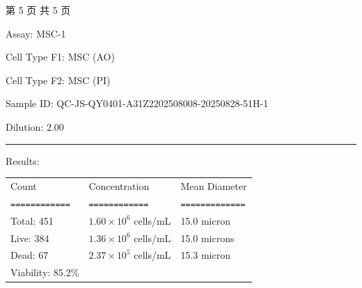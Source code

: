 \documentclass[UTF8,10pt,a4paper,fontset=fandol]{ctexart}
\newcommand{\fieldvalue}[1]{#1}
\begin{document}
\begin{center}
第 5 页 共 5 页
\end{center}

\newpage

\noindent Assay: %
\fieldvalue{MSC-1}

\medskip
\noindent Cell Type F1: %
\fieldvalue{MSC (AO)}

\noindent Cell Type F2: %
\fieldvalue{MSC (PI)}

\medskip
\noindent Sample ID: %
\fieldvalue{QC-JS-QY0401-A31Z2202508008-20250828-51H-1}

\noindent Dilution: %
\fieldvalue{2.00}

\bigskip
\noindent\rule{\textwidth}{0.4pt}

\noindent Results:

\medskip
\begin{tabular}{lll}
Count & Concentration & Mean Diameter \\
\texttt{============} & \texttt{============} & \texttt{=============} \\

Total: %
\fieldvalue{451}
&
\fieldvalue{$1.60{\times}10^{6}$ cells/mL}
&
\fieldvalue{15.0 micron}
\\

Live: %
\fieldvalue{384}
&
\fieldvalue{$1.36{\times}10^{6}$ cells/mL}
&
\fieldvalue{15.0 microns}
\\

Dead: %
\fieldvalue{67}
&
\fieldvalue{$2.37{\times}10^{5}$ cells/mL}
&
\fieldvalue{15.3 micron}
\\

Viability: %
\fieldvalue{85.2\%}
&&
\end{tabular}
\end{document}
